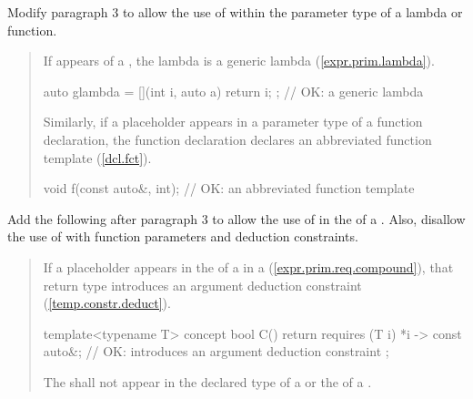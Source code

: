 Modify paragraph 3 to allow the use of  within the 
parameter type of a lambda or function.

\begin{quote}
\pnum
If  
appears  
 of a , the lambda 
is a generic lambda
(\ref{expr.prim.lambda}).
%
\enterexample
\begin{codeblock}
auto glambda = [](int i, auto a) { return i; }; // OK: a generic lambda
\end{codeblock}
\exitexample
%
\begin{addedblock}
Similarly, if a placeholder appears in a parameter type of a function 
declaration, the function declaration declares an abbreviated function 
template (\ref{dcl.fct}).
%
\enterexample
\begin{codeblock}
void f(const auto&, int); // OK: an abbreviated function template
\end{codeblock}
\exitexample
\end{addedblock}
\end{quote}


Add the following after paragraph 3 to allow the use of  in the
 of a .
Also, disallow the use of  with function parameters
and deduction constraints.

\begin{quote}
\pnum
If a placeholder appears in the 
of a  in a  
(\ref{expr.prim.req.compound}), that return type introduces an argument 
deduction constraint (\ref{temp.constr.deduct}).
% 
\enterexample
\begin{codeblock}
template<typename T> concept bool C() {
  return requires (T i) { 
    {*i} -> const auto&; // OK: introduces an argument deduction constraint
  };
}
\end{codeblock}
\exitexample

\pnum
The   shall not appear
in the declared type of a  or the
 of a .
\end{quote}


